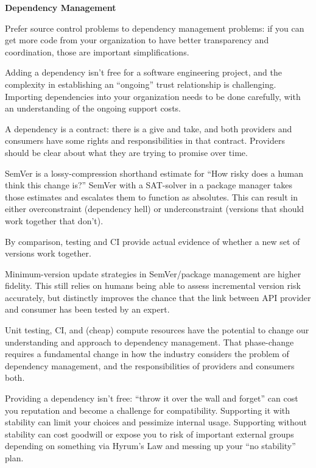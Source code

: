 \item \textbf{Dependency Management}
\bit
\item Prefer source control problems to dependency management problems: if you can get more code from your
organization to have better transparency and coordination, those are important simplifications.
\item Adding a dependency isn't free for a software engineering project, and the complexity in establishing an
``ongoing'' trust relationship is challenging. Importing dependencies into your organization needs to be done
carefully, with an understanding of the ongoing support costs.
\item A dependency is a contract: there is a give and take, and both providers and consumers have some rights and
responsibilities in that contract. Providers should be clear about what they are trying to promise over time.
\item SemVer is a lossy-compression shorthand estimate for ``How risky does a human think this change is?'' SemVer
with a SAT-solver in a package manager takes those estimates and escalates them to function as absolutes. This can
result in either overconstraint (dependency hell) or underconstraint (versions that should work together that don't).
\item By comparison, testing and CI provide actual evidence of whether a new set of versions work together.
\item Minimum-version update strategies in SemVer/package management are higher fidelity. This still relies on humans
being able to assess incremental version risk accurately, but distinctly improves the chance that the link between
API provider and consumer has been tested by an expert.
\item Unit testing, CI, and (cheap) compute resources have the potential to change our understanding and approach to
dependency management. That phase-change requires a fundamental change in how the industry considers the problem of
dependency management, and the responsibilities of providers and consumers both.
\item Providing a dependency isn't free: ``throw it over the wall and forget'' can cost you reputation and become a
challenge for compatibility. Supporting it with stability can limit your choices and pessimize internal usage.
Supporting without stability can cost goodwill or expose you to risk of important external groups depending on
something via Hyrum's Law and messing up your ``no stability'' plan.
\eit

